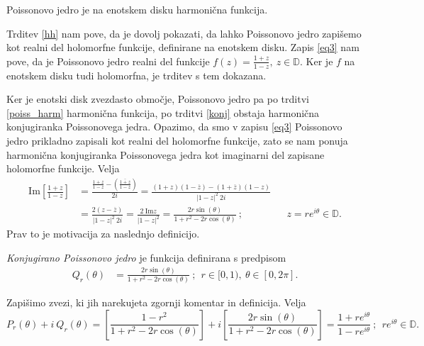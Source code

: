 \documentclass[mat1, tisk]{fmfdelo}
\begin{document}
    \begin{trditev}
        \label{poiss_harm}
        Poissonovo jedro je na enotskem disku harmonična funkcija. 
    \end{trditev}
    \begin{dokaz}
        Trditev \ref{hh} nam pove, da je dovolj pokazati, da lahko Poissonovo jedro zapišemo kot realni del holomorfne funkcije, definirane na enotskem disku.
        Zapis \eqref{eq3} nam pove, da je Poissonovo jedro realni del funkcije $f(z) = \frac{1 + z}{1 - z},~z \in \mathbb{D}$. Ker je $f$ na enotskem disku tudi holomorfna, je trditev s tem dokazana. 
    \end{dokaz}

    Ker je enotski disk zvezdasto območje, Poissonovo jedro pa po trditvi \ref{poiss_harm} harmonična funkcija, po trditvi \ref{konj} obstaja harmonična konjugiranka Poissonovega jedra. 
    Opazimo, da smo v zapisu \eqref{eq3} Poissonovo jedro prikladno zapisali kot realni del holomorfne funkcije, zato se nam ponuja harmonična konjugiranka Poissonovega jedra kot imaginarni del zapisane holomorfne funkcije.
    Velja
    \begin{align*}
        \text{Im}\left[\frac{1 + z}{1-z}\right] &= \frac{\frac{1 + z}{1-z} - \left(\overline{\frac{1 + z}{1-z}}\right)}{2i} = \frac{(1 + z)(1 - \overline{z}) - (1 + \overline{z})(1 - z)}{|1 - z|^2~2i} & & \\ 
        & = \frac{2 (z - \overline{z})}{|1 - z|^2~2i} = \frac{2~\text{Im}z}{|1 - z|^2} = \frac{2 r \sin(\theta)}{1+ r^2 - 2r \cos(\theta)}~; & & z = r e^{i\theta} \in \mathbb{D}.
    \end{align*}
    Prav to je motivacija za naslednjo definicijo. 
    \begin{definicija}
        \emph{Konjugirano Poissonovo jedro} je funkcija definirana s predpisom
        \begin{align}
            Q_r(\theta) & = \frac{2 r \sin(\theta)}{1+ r^2 - 2r \cos(\theta)}~;~~r \in [0,1),~\theta \in [0,2\pi].
        \end{align}
    \end{definicija}

    \begin{opomba}
        Zapišimo zvezi, ki jih narekujeta zgornji komentar in definicija. Velja
        $$
        P_r(\theta) + i~Q_r(\theta) = \left[ \frac{1-r^2}{1+ r^2 - 2r \cos(\theta)}\right] + i \left[\frac{2 r \sin(\theta)}{1+ r^2 - 2r \cos(\theta)}\right] = \frac{1 + re^{i\theta}}{1 - re^{i\theta}}~;~~r e^{i\theta} \in \mathbb{D}.
        $$      
    \end{opomba}
\end{document}
